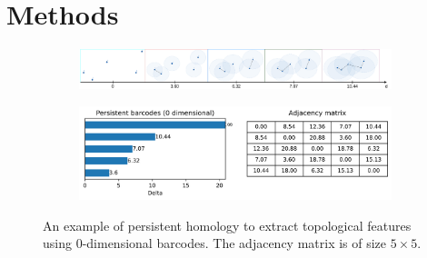 \vspace{-0.2cm}
\section{Methods}
\label{sec:methods}
\vspace{-0.1cm}

\begin{figure}[t]%
	\centering
	\begin{subfigure}[t]{1\textwidth}
		\centering
		\includegraphics[width=1\textwidth, trim={0cm, 0.0cm, 0.0cm, 0.0cm}]{figures/barcodes_generation_border.png}\hfill
	\end{subfigure}
	\hfill
	\begin{subfigure}[t]{1\textwidth}
		\centering
		\includegraphics[width=1\textwidth, trim={0cm, 0.0cm, 0.0cm, 0.0cm}]{figures/barcode_matrix_title.png}\hfill
	\end{subfigure}
	\hfill
	\caption{An example of persistent homology to extract topological features using 0-dimensional barcodes. The adjacency matrix is of size $5 \times 5$.}
	\label{fig:rips_new}
\end{figure}
